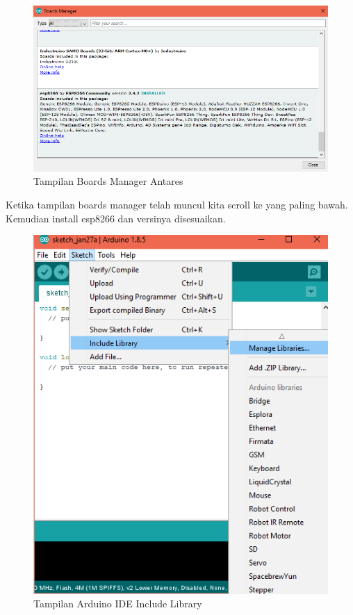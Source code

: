 \begin{enumerate}
    \begin{figure}[H]
    \centering
    \includegraphics[width=1\textwidth]{figures/manager6.png}
    \caption{Tampilan Boards Manager Antares}
    \label{print}
    \end{figure}
    \par Ketika tampilan boards manager telah muncul kita scroll ke yang paling bawah. Kemudian install esp8266 dan versinya disesuaikan.
    
    \begin{figure}[H]
    \centering
    \includegraphics[width=1\textwidth]{figures/managelib.png}
    \caption{Tampilan Arduino IDE Include Library}
    \label{print}
    \end{figure}
    

\end{enumerate}
